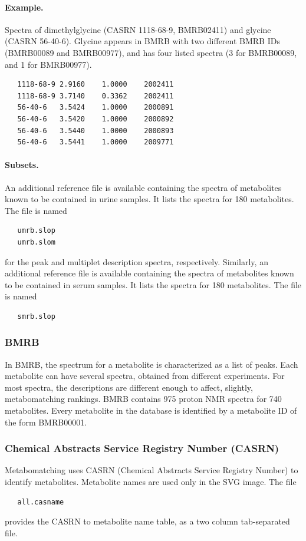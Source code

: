 \documentclass[a4paper,11pt]{article}
\begin{document}
\paragraph{Example.} Spectra of dimethylglycine (CASRN 1118-68-9, BMRB02411) and glycine (CASRN 56-40-6). Glycine appears in BMRB with two different BMRB IDs (BMRB00089 and BMRB00977), and has four listed spectra (3 for BMRB00089, and 1 for BMRB00977).
\begin{verbatim}
   1118-68-9 2.9160    1.0000    2002411
   1118-68-9 3.7140    0.3362    2002411
   56-40-6   3.5424    1.0000    2000891
   56-40-6   3.5420    1.0000    2000892   
   56-40-6   3.5440    1.0000    2000893
   56-40-6   3.5441    1.0000    2009771
\end{verbatim}
\paragraph{Subsets.} An additional reference file is available containing the spectra of metabolites known to be contained in urine samples. It lists the spectra for 180 metabolites. The file is named
\begin{verbatim}
   umrb.slop
   umrb.slom
\end{verbatim}
for the peak and multiplet description spectra, respectively. Similarly, an additional reference file is available containing the spectra of metabolites known to be contained in serum samples. It lists the spectra for 180 metabolites. The file is named
\begin{verbatim}
   smrb.slop
\end{verbatim}
\subsubsection{BMRB}
In BMRB, the spectrum for a metabolite is characterized as a list of peaks. Each metabolite can have several spectra, obtained from different experiments. For most spectra, the descriptions are different enough to affect, slightly, metabomatching rankings. BMRB contains 975 proton NMR spectra for 740 metabolites. Every metabolite in the database is identified by a metabolite ID of the form BMRB00001.
\subsubsection{Chemical Abstracts Service Registry Number (CASRN)}
Metabomatching uses CASRN (Chemical Abstracts Service Registry Number) to identify metabolites. Metabolite names are used only in the SVG image. The file
\begin{verbatim}
   all.casname
\end{verbatim}
provides the CASRN to metabolite name table, as a two column tab-separated file.
\end{document}
